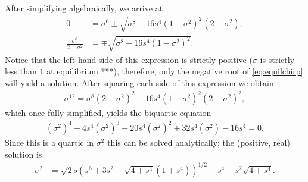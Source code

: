 After simplifying algebraically, we arrive at
\begin{align*}
0 &= \sigma^6 \pm \sqrt{\sigma^8 - 16s^4(1 - \sigma^2)^2}(2 - \sigma^2), \\
\frac{\sigma^6}{2 - \sigma^2} &= \mp \sqrt{\sigma^8 - 16s^4(1 - \sigma^2)^2}.
\end{align*}
Notice that the left hand side of this expression is strictly positive ($\sigma$ is strictly less than $1$ at equilibrium ***), therefore, only the negative root of \eqref{eq:equilchirp} will yield a solution. After squaring each side of this expression we obtain
\begin{align*}
\sigma^{12} = \sigma^8 (2 - \sigma^2)^2 - 16s^4 (1 - \sigma^2)^2 (2 - \sigma^2)^2,
\end{align*}
which once fully simplified, yields the biquartic equation
\begin{align*}
\left( \sigma^2 \right)^4 + 4 s^4 \left( \sigma^2 \right)^3 - 20 s^4 \left( \sigma^2 \right)^2 + 32 s^4 \left( \sigma^2 \right) - 16 s^4 = 0.
\end{align*}
Since this is a quartic in $\sigma^2$ this can be solved analytically; the (positive, real) solution is
\begin{align}
\label{eq:equilvar}
\sigma^2 &= \sqrt{2} s \left( s^6 + 3s^2 + \sqrt{4 + s^4}(1 + s^4) \right)^{1/2} - s^4 - s^2 \sqrt{4 + s^4}.
\end{align}

